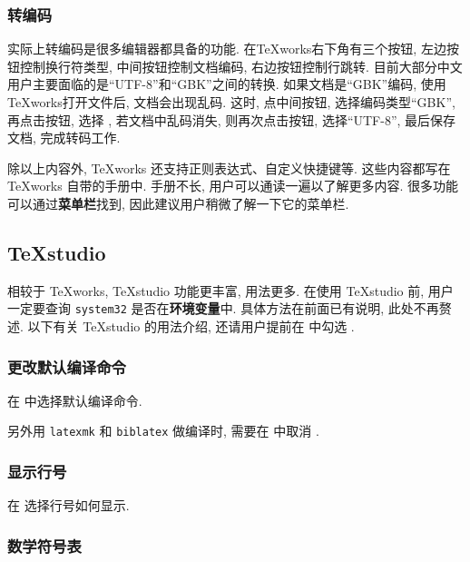 \subsubsection{转编码}

实际上转编码是很多编辑器都具备的功能. 
在\TeX works右下角有三个按钮,
左边按钮控制换行符类型, 中间按钮控制文档编码, 右边按钮控制行跳转. 
目前大部分中文用户主要面临的是``UTF-8''和``GBK''之间的转换. 
如果文档是``GBK''编码, 使用\TeX works打开文件后, 文档会出现乱码. 
这时, 点中间按钮, 选择编码类型``GBK'', 再点击按钮,
选择 , 若文档中乱码消失, 则再次点击按钮,
选择``UTF-8'', 最后保存文档, 完成转码工作. 

除以上内容外, \TeX works 还支持正则表达式、自定义快捷键等. 
这些内容都写在 \TeX works 自带的手册中. 
手册不长, 用户可以通读一遍以了解更多内容.
很多功能可以通过\textbf{菜单栏}找到,
因此建议用户稍微了解一下它的菜单栏.

\subsection{\TeX studio}

相较于 \TeX works, \TeX studio 功能更丰富, 用法更多.
在使用 \TeX studio 前,
用户一定要查询 \texttt{system32} 是否在\textbf{环境变量}中.
具体方法在前面已有说明, 此处不再赘述.
以下有关 \TeX studio 的用法介绍,
还请用户提前在  中勾选
.

\subsubsection{更改默认编译命令}

在 
中选择默认编译命令. 

另外用 \texttt{latexmk} 和 \texttt{biblatex} 做编译时,
需要在 
中取消 . 

\subsubsection{显示行号}

在  选择行号如何显示.

\subsubsection{数学符号表}


